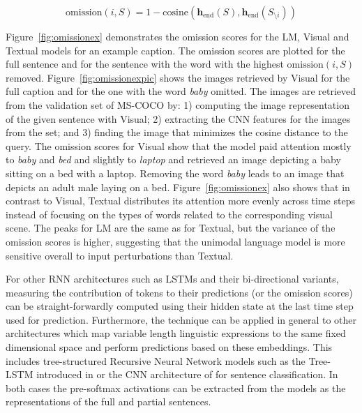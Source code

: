 \begin{equation}
\label{eg:omit}
\mathrm{omission}(i,S) = 1-\mathrm{cosine}(\mathbf{h}_\text{end}(S),
\mathbf{h}_\text{end}(S_{\setminus i}))
\end{equation}

\noindent Figure~\ref{fig:omissionex} demonstrates the omission
scores for the {\sc LM}, {\sc Visual} and {\sc Textual} models for an
example caption. The omission scores are
plotted for the
full sentence and for the sentence with the word with the highest
$\mathrm{omission}(i,S)$ removed. 
Figure~\ref{fig:omissionexpic} shows the images retrieved by {\sc
  Visual} for the full
caption and for the one with the word {\it baby} omitted. 
The images are retrieved from the validation set of MS-COCO by: 1)
computing the image representation of the given sentence with {\sc
  Visual}; 2) extracting the CNN features for the images from the set;
and 3) finding the image that minimizes the cosine distance to the
query.\label{edit:retrievalexplain} 
The omission scores for {\sc Visual} show that the model paid attention
mostly to {\it baby} and {\it bed} and slightly to {\it laptop} and
retrieved an image depicting a baby sitting on a bed with a laptop.
Removing the word {\it baby} leads to an image that depicts an adult
male laying on a bed. Figure~\ref{fig:omissionex} also shows that in
contrast to {\sc Visual}, {\sc Textual} distributes
its attention more evenly across time steps instead of focusing on the
types of words related to the corresponding visual scene. The peaks
for {\sc LM} are the same as for {\sc Textual}, but the variance of
the omission scores is higher, suggesting that the unimodal language
model is more sensitive overall to input perturbations than {\sc Textual}.


For other RNN architectures such as LSTMs \label{edit:omitgeneral}
and their bi-directional variants, measuring the contribution
of tokens to their predictions (or the omission scores)
can be straight-forwardly computed using their hidden state 
at the last time step used for prediction. Furthermore, the technique 
can be applied in general to other architectures which
map variable length linguistic expressions to the same fixed dimensional
space and perform predictions based on these embeddings. 
This includes tree-structured Recursive Neural Network models such as the Tree-LSTM
introduced in  or the CNN architecture of  
for sentence classification. In both cases the pre-softmax activations can be extracted 
from the models as the representations of the full and partial sentences.   


